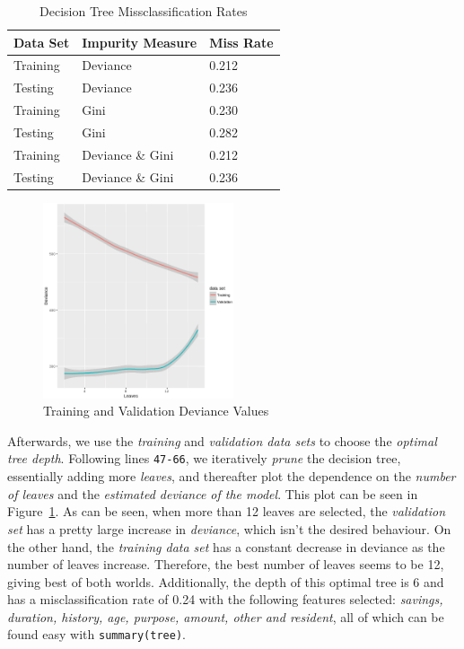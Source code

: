 \documentclass[a4paper, twocolumn]{article}
\begin{document}
        \begin{table}[h!]
        \begin{center}
        \begin{tabular}{lll}
            \toprule
                \textbf{Data Set} & \textbf{Impurity Measure} & \textbf{Miss Rate} \\
            \midrule
                Training & Deviance & 0.212 \\
                Testing & Deviance & 0.236 \\
                Training & Gini & 0.230 \\
                Testing & Gini & 0.282 \\
                Training & Deviance \& Gini & 0.212 \\
                Testing & Deviance \& Gini & 0.236 \\
            \bottomrule
        \end{tabular}
        \end{center}
        \caption{Decision Tree Missclassification Rates}
        \label{table:dectree}
        \end{table}

        \begin{figure}[h!]
            \centering
            \caption{Training and Validation Deviance Values}
            \label{fig:deviance}
            \includegraphics[width=0.5\textwidth]{share/deviance.eps}
        \end{figure}

        Afterwards, we use the \emph{training} and \emph{validation data sets} to choose the \emph{optimal tree depth}. Following lines \texttt{47-66}, we iteratively \emph{prune} the decision tree, essentially adding more \emph{leaves}, and thereafter plot the dependence on the \emph{number of leaves} and the \emph{estimated deviance of the model}. This plot can be seen in Figure~\ref{fig:deviance}. As can be seen, when more than 12 leaves are selected, the \emph{validation set} has a pretty large increase in \emph{deviance}, which isn't the desired behaviour. On the other hand, the \emph{training data set} has a constant decrease in deviance as the number of leaves increase. Therefore, the best number of leaves seems to be 12, giving best of both worlds. Additionally, the depth of this optimal tree is 6 and has a misclassification rate of 0.24 with the following features selected: \emph{savings, duration, history, age, purpose, amount, other and resident}, all of which can be found easy with \texttt{summary(tree)}.
\end{document}
